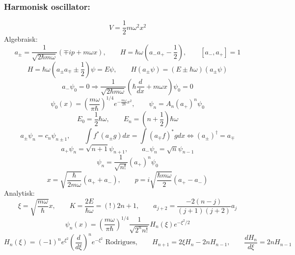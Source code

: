 \documentclass[a4paper,norsk, 10pt]{article}
\begin{document}
\subsubsection{Harmonisk oscillator:}

\begin{equation}
V = \frac{1}{2}m\omega^2x^2
\end{equation}
Algebraisk:
\begin{equation}
a_{\pm} = \frac{1}{\sqrt{2\hbar m\omega}}(\mp ip + m\omega x), \qquad H = \hbar\omega(a_-a_+ - \frac{1}{2}),\qquad [a_-,a_+]=1
\end{equation}
\begin{equation}
H = \hbar \omega(a_{\pm}a_{\mp} \pm \frac{1}{2})\psi = E\psi, \qquad H(a_{\pm}\psi) = (E\pm\hbar\omega)(a_{\pm}\psi)
\end{equation}
\begin{equation}
a_-\psi_0 = 0 \Rightarrow \frac{1}{\sqrt{2\hbar m\omega}}\left(\hbar \frac{d}{dx} + m\omega x\right)\psi_0 = 0
\end{equation}
\begin{equation}
\psi_0(x) = \left(\frac{m\omega}{\pi \hbar}\right)^{1/4}e^{-\frac{m\omega}{2\hbar}x^2}, \qquad \psi_n = A_n(a_+)^n\psi_0
\end{equation}
\begin{equation}
E_0 = \frac{1}{2}\hbar\omega, \qquad E_n = \left(n + \frac{1}{2}\right)\hbar \omega
\end{equation}
\begin{equation}
a_{\pm}\psi_n = c_n\psi_{n\pm1}, \qquad \int f^*(a_{\pm}g)dx = \int(a_{\mp}f)^*gdx \Leftrightarrow (a_{\pm})^{\dagger} = a_{\mp}
\end{equation}
\begin{equation}
a_+\psi_n = \sqrt{n+1}\psi_{n+1}, \qquad a_-\psi_n = \sqrt{n}\psi_{n-1}
\end{equation}
\begin{equation}
\psi_n = \frac{1}{\sqrt{n!}}(a_+)^n\psi_0
\end{equation}
\begin{equation}
x = \sqrt{\frac{\hbar}{2m\omega}}(a_+ + a_-),\qquad p = i\sqrt{\frac{\hbar m \omega}{2}}(a_+ - a_-)
\end{equation}
Analytisk:
\begin{equation}
\xi = \sqrt{\frac{m\omega}{\hbar}}x, \qquad K = \frac{2E}{\hbar \omega} =(!) 2n+1, \qquad a_{j+2} = \frac{-2(n-j)}{(j+1)(j+2)}a_j
\end{equation}
\begin{equation}
\psi_n(x) = \left(\frac{m\omega}{\pi \hbar}\right)^{1/4}\frac{1}{\sqrt{2^n n!}}H_n(\xi)e^{-\xi^2/2}
\end{equation}
\begin{equation}
H_n(\xi) = (-1)^ne^{\xi^2}\left(\frac{d}{d\xi}\right)^n e^{-\xi^2} \text{ Rodrigues}, \qquad H_{n+1} = 2\xi H_n -2nH_{n-1}, \qquad \frac{dH_n}{d\xi} = 2n H_{n-1}
\end{equation}
\end{document}

